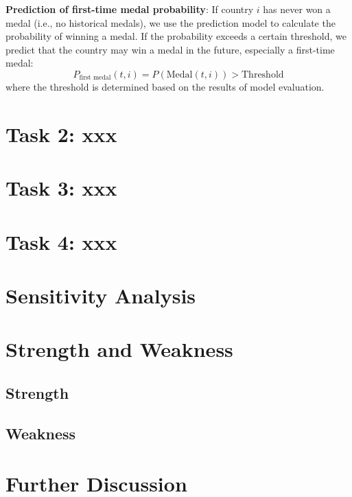\documentclass{mcmthesis}
\begin{document}
\textbf{Prediction of first-time medal probability}:
If country $i$ has never won a medal (i.e., no historical medals), we use the prediction model to calculate the probability of winning a medal. If the probability exceeds a certain threshold, we predict that the country may win a medal in the future, especially a first-time medal:
\[
P_{\text{first medal}}(t,i) = P(\text{Medal}(t,i)) > \text{Threshold}
\]
where the threshold is determined based on the results of model evaluation.






















\section{Task 2: xxx}

\section{Task 3: xxx}

\section{Task 4: xxx}

\section{Sensitivity Analysis}

\section{Strength and Weakness}
\subsection{Strength}
\subsection{Weakness}

\section{Further Discussion}
\end{document}
